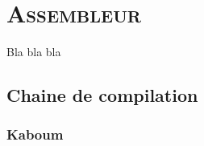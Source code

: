 \chapter{\textsc{Assembleur}}

Bla bla bla


\section{Chaine de compilation}


\subsection{Kaboum}






